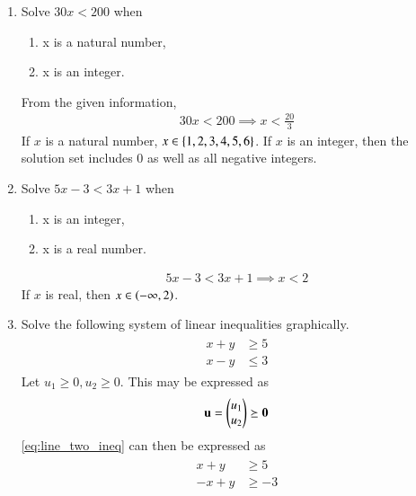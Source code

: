 \renewcommand{\theequation}{\theenumi}
\begin{enumerate}[label=\arabic*.,ref=\thesubsection.\theenumi]
    \item Solve $30x < 200$ when
    \begin{enumerate} 
    \item  x is a natural number,
    \item x is an integer.
\end{enumerate}
\solution From the given information, 
\begin{align}
30x < 200 \implies x < \frac{20}{3}
\label{eq:lineq_nat}
\end{align}
If $x$ is a natural number, $x \in \left\{1, 2, 3, 4, 5, 6\right\}$. If $x$ is an integer, then the solution set includes 0 as well as all negative integers.
    \item Solve $5x-3 < 3x+1$ when
    \begin{enumerate} 
\item  x is an integer,
    \item x is a real number.
\end{enumerate}
\solution 
\begin{align}
5x-3 < 3x+1 \implies x < 2
\label{eq:lineq_real}
\end{align}
%
If $x$ is real, then $x \in \left(-\infty, 2\right)$. 
    \item Solve the following system of linear inequalities graphically.
\begin{align}
\label{eq:line_two_ineq}
\begin{split}
    x+y &\geq 5
\\
    x-y &\leq 3
\end{split}
\end{align}
\solution  Let $u_1 \ge 0, u_2 \ge 0$.  This may be expressed as
\begin{align}
\mathbf{u} = \begin{pmatrix}u_1\\u_2\end{pmatrix}\succeq \mathbf{0}
\end{align}
%
\eqref{eq:line_two_ineq} can then be expressed as
\begin{align}
\begin{split}
    x+y &\geq 5
\\
    -x+y &\geq -3
\end{split}
%
\\

\end{align}
\end{enumerate}
